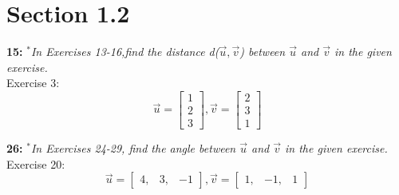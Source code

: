 \documentclass[12pt,letterpaper]{hmcpset}
\begin{document}

\section{Section 1.2}

\begin{problem}
\textbf{15:} \textit{$^*$In Exercises 13-16,find the distance d($\vec{u}, \vec{v}$) between $\vec{u}$ and
$\vec{v}$ in the given exercise.} \\
Exercise 3: \\
\[ \vec{u} = \begin{bmatrix} 1 \\ 2 \\ 3 \end{bmatrix}, \vec{v} = \begin{bmatrix} 2 \\ 3\\ 1 \end{bmatrix} \]
\end{problem}



\pagebreak

\begin{problem}
\textbf{26:} \textit{$^*$In Exercises 24-29, find the angle between $\vec{u}$ and $\vec{v}$ in the
given exercise. } \\
Exercise 20: \\
\[ \vec{u} = \begin{bmatrix} 4, & 3, & -1 \end{bmatrix}, \vec{v} = \begin{bmatrix} 1, & -1, & 1 \end{bmatrix} \]
\end{problem}

\vspace{180pt}
\pagebreak
\end{document}
